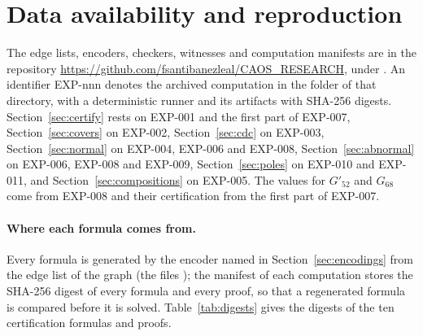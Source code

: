 \documentclass[11pt]{article}
\theoremstyle{definition}
\theoremstyle{remark}
\newcommand{\Gftyb}{G'_{52}}
\newcommand{\Gsix}{G_{68}}
\begin{document}
\section{Data availability and reproduction}\label{sec:data}

{\raggedright
The edge lists, encoders, checkers, witnesses and computation manifests are in the repository
\url{https://github.com/fsantibanezleal/CAOS_RESEARCH}, under
. An identifier EXP-nnn denotes the archived
computation in the folder  of that directory, with a deterministic
runner and its artifacts with SHA-256 digests. Section~\ref{sec:certify} rests on EXP-001 and the
first part of EXP-007, Section~\ref{sec:covers} on EXP-002, Section~\ref{sec:cdc} on EXP-003,
Section~\ref{sec:normal} on EXP-004, EXP-006 and EXP-008, Section~\ref{sec:abnormal} on EXP-006,
EXP-008 and EXP-009, Section~\ref{sec:poles} on EXP-010 and EXP-011, and
Section~\ref{sec:compositions} on EXP-005. The values for $\Gftyb$ and $\Gsix$ come from EXP-008 and
their certification from the first part of EXP-007.
\par}

\paragraph{Where each formula comes from.} Every formula is generated by the encoder named in
Section~\ref{sec:encodings} from the edge list of the graph (the files ); the
manifest of each computation stores the SHA-256 digest of every formula and every proof, so that a
regenerated formula is compared before it is solved. Table~\ref{tab:digests} gives the digests of the
ten certification formulas and proofs.
\end{document}
